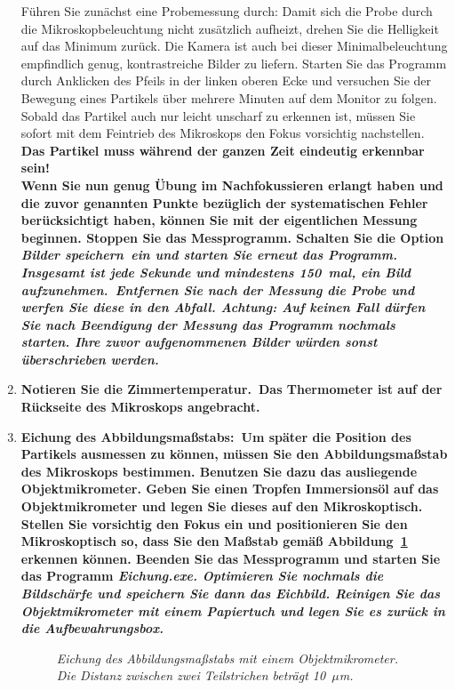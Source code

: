 \documentclass{../papanleitung}
\begin{document}
\begin{enumerate}
F\"{u}hren Sie zun\"{a}chst eine Probemessung durch: Damit sich die Probe
durch die Mikroskopbeleuchtung nicht zus\"{a}tzlich aufheizt, drehen
Sie die Helligkeit auf das Minimum zur\"{u}ck. Die Kamera ist auch bei
dieser Minimalbeleuchtung empfindlich genug, kontrastreiche Bilder
zu liefern. Starten Sie das Programm durch Anklicken des Pfeils in
der linken oberen Ecke und versuchen Sie der Bewegung eines
Partikels \"{u}ber mehrere Minuten auf dem Monitor zu folgen. Sobald
das Partikel auch nur leicht unscharf zu erkennen ist, m\"{u}ssen Sie
sofort mit dem Feintrieb des Mikroskops den Fokus vorsichtig
nachstellen. \bf Das Partikel muss
w\"{a}hrend der ganzen Zeit eindeutig erkennbar sein!\rm\\

Wenn Sie nun genug \"{U}bung im Nachfokussieren erlangt haben und die
zuvor genannten Punkte bez\"{u}glich der systematischen Fehler
ber\"{u}cksichtigt haben, k\"{o}nnen Sie mit der eigentlichen Messung
beginnen. Stoppen Sie das Messprogramm. Schalten Sie die Option
\it Bilder speichern\rm~ein und starten Sie erneut das Programm.
\bf Insgesamt ist jede Sekunde und mindestens 150~mal, ein Bild
aufzunehmen.\rm~Entfernen Sie nach der Messung die Probe und
werfen Sie diese in den Abfall. \bf Achtung: Auf keinen Fall
d\"{u}rfen Sie nach Beendigung der Messung das Programm nochmals
starten. Ihre zuvor aufgenommenen Bilder w\"{u}rden sonst
\"{u}berschrieben werden.\rm

\item \bf Notieren Sie die Zimmertemperatur.\rm~Das Thermometer
ist auf der R\"{u}ckseite des Mikroskops angebracht.

\item \bf Eichung des Abbildungsma{\ss}stabs:\rm~Um sp\"{a}ter die
Position des Partikels ausmessen zu k\"{o}nnen, m\"{u}ssen Sie den
Abbildungsma{\ss}stab des Mikros\-kops bestimmen. Benutzen Sie dazu
das ausliegende Objektmikrometer. Geben Sie einen Tropfen
Immersions\"{o}l auf das Objektmikrometer und legen Sie dieses auf den
Mikroskoptisch. Stellen Sie vorsichtig den Fokus ein und
positionieren Sie den Mikroskoptisch so, dass Sie den Ma{\ss}stab
gem\"{a}{\ss} Abbildung~\ref{249_Eichung} erkennen k\"{o}nnen. Beenden Sie das
Messprogramm und starten Sie das Programm \it Eichung.exe\rm.
Optimieren Sie nochmals die Bildsch\"{a}rfe und speichern Sie dann das
Eichbild. Reinigen Sie das Objektmikrometer mit einem Papiertuch
und legen Sie es zur\"{u}ck in die Aufbewahrungsbox.

\begin{figure}
\begin{minipage}[c]{12cm}
\centering{}
\caption{\label{249_Eichung}\fontsize{10}{12}\it Eichung des
Abbildungsma{\ss}stabs mit einem Objektmikrometer. Die Distanz
zwischen zwei Teilstrichen betr\"{a}gt 10~$\mu$m. }
\end{minipage}
\end{figure}


\end{enumerate}
\end{document}
